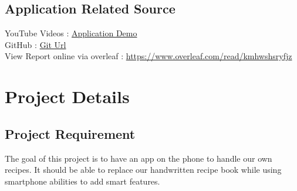 \documentclass{article}
\begin{document}
\subsection{Application Related Source}
YouTube Videos : \href{https://youtu.be/vgawyQmJWpk}{Application Demo} \\
GitHub : \href{https://github.com/thphuc/cooking-app}{Git Url} \\
View Report online via overleaf : \href{https://www.overleaf.com/read/kmhwshsryfjz
}{https://www.overleaf.com/read/kmhwshsryfjz}


\newpage
\section{Project Details }
\subsection{Project Requirement}
\qquad The goal of this project is to have an app on the phone to handle our own recipes. It should be able to replace our handwritten recipe book while using smartphone abilities to add smart features.
\end{document}
